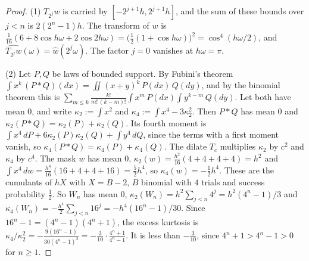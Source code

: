 \begin{proof}
\leanok
{}
(1) $T_{2^j}w$ is carried by $[-2^{j+1}h, 2^{j+1}h]$, and the sum of these bounds over $j < n$ is
$2(2^n - 1)h$. The transform of $w$ is $\tfrac1{16}(6 + 8\cos h\omega + 2\cos 2h\omega)
= \bigl(\tfrac12(1 + \cos h\omega)\bigr)^2 = \cos^4(h\omega/2)$, and
$\widehat{T_{2^j}w}(\omega) = \widehat w(2^j\omega)$. The factor $j = 0$ vanishes at
$h\omega = \pi$.

(2) Let $P, Q$ be laws of bounded support. By Fubini's theorem
$\int x^k\,(P * Q)(dx) = \iint(x + y)^k\,P(dx)\,Q(dy)$, and by the binomial theorem this is
$\sum_{m \le k}\frac{k!}{m!\,(k-m)!}\int x^m\,P(dx)\int y^{k-m}\,Q(dy)$. Let both have mean $0$,
and write $\kappa_2 := \int x^2$ and $\kappa_4 := \int x^4 - 3\kappa_2^2$. Then $P * Q$ has mean
$0$ and $\kappa_2(P * Q) = \kappa_2(P) + \kappa_2(Q)$. Its fourth moment is
$\int x^4\,dP + 6\kappa_2(P)\kappa_2(Q) + \int y^4\,dQ$, since the terms with a first moment
vanish, so $\kappa_4(P * Q) = \kappa_4(P) + \kappa_4(Q)$. The dilate $T_c$ multiplies
$\kappa_2$ by $c^2$ and $\kappa_4$ by $c^4$. The mask $w$ has mean $0$,
$\kappa_2(w) = \tfrac{h^2}{16}(4 + 4 + 4 + 4) = h^2$ and
$\int x^4\,dw = \tfrac{h^4}{16}(16 + 4 + 4 + 16) = \tfrac52h^4$, so $\kappa_4(w) = -\tfrac12h^4$.
These are the cumulants of $hX$ with $X = B - 2$, $B$ binomial with $4$ trials and success
probability $\tfrac12$. So $W_n$ has mean $0$,
$\kappa_2(W_n) = h^2\sum_{j<n}4^j = h^2(4^n - 1)/3$ and
$\kappa_4(W_n) = -\tfrac{h^4}2\sum_{j<n}16^j = -h^4(16^n - 1)/30$. Since
$16^n - 1 = (4^n - 1)(4^n + 1)$, the excess kurtosis is
$\kappa_4/\kappa_2^2 = -\tfrac{9(16^n - 1)}{30(4^n - 1)^2} = -\tfrac3{10}\cdot\tfrac{4^n + 1}{4^n - 1}$.
It is less than $-\tfrac3{10}$, since $4^n + 1 > 4^n - 1 > 0$ for $n \ge 1$.


\end{proof}
